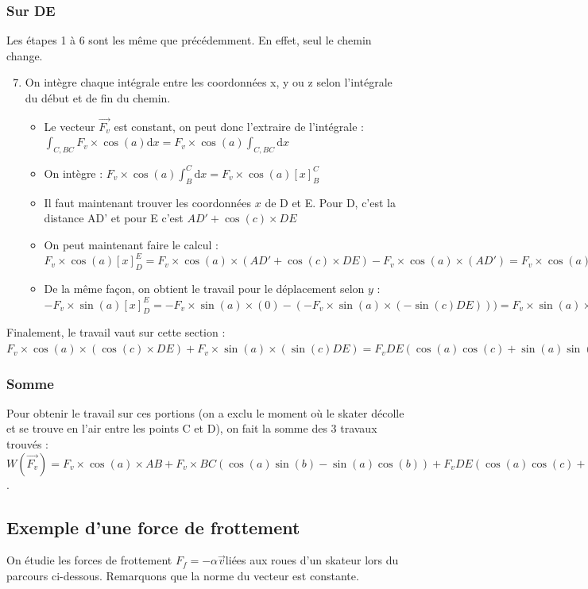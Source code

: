 \documentclass[french]{yLectureNote}
\renewcommand{\vec}{\overrightarrow}
\newcommand{\dd}[0]{\mathrm{d}}
\begin{document}
\subsubsection{Sur DE}
Les étapes 1 à 6 sont les m\^eme que précédemment. En effet, seul le chemin change.
\begin{enumerate}
\setcounter{enumi}{6}
  \item On intègre chaque intégrale entre les coordonnées x, y ou z selon l'intégrale du début et de fin du chemin.
  \begin{itemize}
   \item Le vecteur $\vec{F_v}$ est constant, on peut donc l'extraire de l'intégrale : $\int_{C,BC}F_v\times\cos(a) \dd x = F_v\times\cos(a)\int_{C,BC} \dd x$
   \item On intègre : $ F_v\times\cos(a)\int_{B}^C \dd x = F_v\times\cos(a)[x]_{B}^C$
   \item Il faut maintenant trouver les coordonnées $x$ de D et E. Pour D, c'est la distance AD' et pour E c'est $AD' + \cos(c)\times DE$
   \item On peut maintenant faire le calcul : $F_v\times\cos(a)[x]_{D}^E = F_v\times\cos(a)\times(AD' + \cos(c)\times DE) - F_v\times\cos(a)\times(AD') = F_v\times\cos(a)\times(\cos(c)\times DE)$
   \item De la m\^eme façon, on obtient le travail pour le déplacement selon $y$ : $-F_v\times\sin(a)[x]_{D}^E = -F_v\times\sin(a)\times(0) - (-F_v\times\sin(a)\times (-\sin(c)DE))) = F_v\times\sin(a)\times(\sin(c)DE)$
  \end{itemize}
\end{enumerate}
Finalement, le travail vaut sur cette section : $F_v\times\cos(a)\times(\cos(c)\times DE)+F_v\times\sin(a)\times(\sin(c)DE) = F_vDE(\cos(a)\cos(c)+\sin(a)\sin(c))$
\subsubsection{Somme}
Pour obtenir le travail sur ces portions (on a exclu le moment où le skater décolle et se trouve en l'air entre les points C et D), on fait la somme des 3 travaux trouvés : $W(\vec{F_v}) = F_v\times\cos(a)\times AB + F_v\times BC(\cos(a)\sin(b)-\sin(a)\cos(b)) + F_vDE(\cos(a)\cos(c)+\sin(a)\sin(c))$.
\subsection{Exemple d'une force de frottement}
On étudie les forces de frottement $F_f = -\alpha \vec{v}$liées aux roues d'un skateur lors du parcours ci-dessous. Remarquons que la norme du vecteur est constante.
\end{document}
